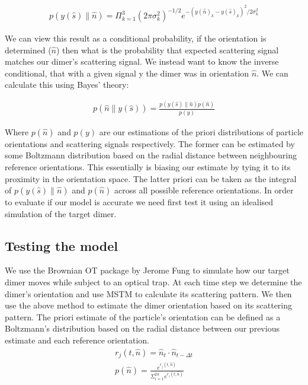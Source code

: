 \documentclass[11pt]{article}
\begin{document}
\begin{align}
	p(y(\hat{s})\parallel\hat{n}) = \Pi^3_{k=1} 
	(2\pi\sigma_k^2)^{-1/2} e^{-(y(\hat{n})_k-y(\hat{s})_k)^2/2\sigma_k^2}
\end{align}

We can view this result as a conditional probability, if the orientation is determined ($\hat{n}$) then what is the probability that expected scattering signal matches our dimer's scattering signal. We instead want to know the inverse conditional, that with a given signal y the dimer was in orientation $\hat{n}$. We can calculate this using Bayes' theory:

\begin{align}
	p(\hat{n}\parallel y(\hat{s})) = \frac{p(y(\hat{s})\parallel\hat{n})p(\hat{n})}{p(y)}
\end{align}

Where $p(\hat{n})$ and $p(y)$ are our estimations of the priori distributions of particle orientations and scattering signals respectively. The former can be estimated by some Boltzmann distribution based on the radial distance between neighbouring reference orientations. This essentially is biasing our estimate by tying it to its proximity in the orientation space. The latter priori can be taken as the integral of  $p(y(\hat{s})\parallel \hat{n})$ and $p(\hat{n})$ across all possible reference orientations. In order to evaluate if our model is accurate we need first test it using an idealised simulation of the target dimer. 

\subsection*{Testing the model}
We use the Brownian OT package by Jerome Fung \cite{5} to simulate how our target dimer moves while subject to an optical trap. At each time step we determine the dimer's orientation and use MSTM to calculate its scattering pattern. We then use the above method to estimate the dimer orientation based on its scattering pattern. The priori estimate of the particle's orientation can be defined as a Boltzmann's distribution based on the radial distance between our previous estimate and each reference orientation. 
\begin{align}
	r_j(t, \hat{n}) = \hat{n}_{t} \cdot \hat{n}_{t-\Delta t} \\
	p(\hat{n}) = \frac{e^{r_j(t,\hat{n})}}
	{\Sigma_{i=1}^{24}e^{r_i(t, \hat{n})}}
\end{align}
\end{document}
